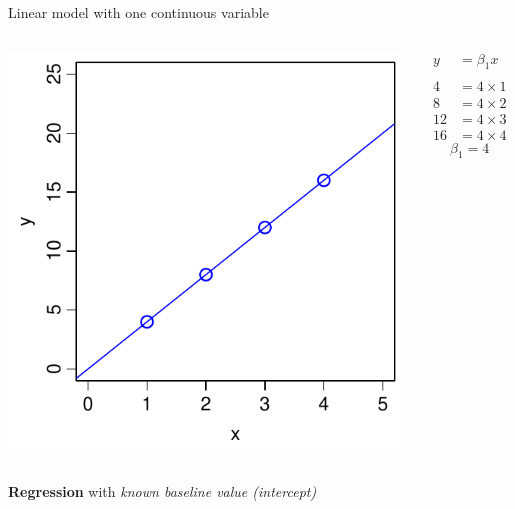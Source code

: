 \documentclass[xcolor=x11names,compress]{beamer}
\renewcommand{\(}{\begin{columns}}
\renewcommand{\)}{\end{columns}}
\newcommand{\<}[1]{\begin{column}{#1}}
\renewcommand{\>}{\end{column}}
\begin{document}
\begin{frame}{Linear model with one continuous variable}

    \begin{columns}[T]
    
            \includegraphics[width=\textwidth]{Origin.pdf}
            
            \begin{align*}
              y  &=  \beta_1 x \\
              \\
              4  &=  4 \times 1 \\
              8  &=  4 \times 2 \\
              12 &=  4 \times 3 \\
              16 &=  4 \times 4   
            \end{align*}
            \[\beta_1 =4\]
    \end{columns}

\pause

\begin{center}
    {\bf Regression} with {\it known baseline value (intercept) }
\end{center}

\end{frame}
\end{document}
